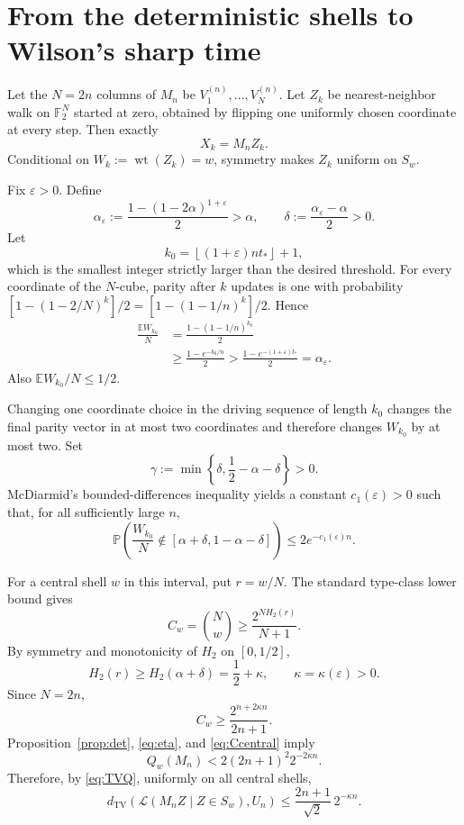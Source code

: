 \documentclass[11pt]{article}
\newcommand{\F}{\mathbb F}
\newcommand{\TV}{d_{\mathrm{TV}}}
\newcommand{\1}{\mathbf 1}
\newcommand{\wt}{\operatorname{wt}}
\newcommand{\E}{\mathbb E}
\newcommand{\Pp}{\mathbb P}
\begin{document}
\section{From the deterministic shells to Wilson's sharp time}

Let the $N=2n$ columns of $M_n$ be $V_1^{(n)},\dots,V_N^{(n)}$.  Let $Z_k$ be nearest-neighbor walk on $\F_2^N$ started at zero, obtained by flipping one uniformly chosen coordinate at every step.  Then exactly
\begin{equation}\label{eq:projection}
 X_k=M_nZ_k.
\end{equation}
Conditional on $W_k:=\wt(Z_k)=w$, symmetry makes $Z_k$ uniform on $S_w$.

Fix $\varepsilon>0$.  Define
\[
 \alpha_\varepsilon
 :=\frac{1-(1-2\alpha)^{1+\varepsilon}}2>\alpha,
 \qquad
 \delta:=\frac{\alpha_\varepsilon-\alpha}{2}>0.
\]
Let
\begin{equation}\label{eq:k0}
 k_0=\left\lfloor(1+\varepsilon)nt_*\right\rfloor+1,
\end{equation}
which is the smallest integer strictly larger than the desired threshold.
For every coordinate of the $N$-cube, parity after $k$ updates is one with probability
$[1-(1-2/N)^k]/2=[1-(1-1/n)^k]/2$.  Hence
\begin{align}
 \frac{\E W_{k_0}}N
 &=\frac{1-(1-1/n)^{k_0}}2\\
 &\ge\frac{1-e^{-k_0/n}}2
 >\frac{1-e^{-(1+\varepsilon)t_*}}2
 =\alpha_\varepsilon.
\end{align}
Also $\E W_{k_0}/N\le1/2$.

Changing one coordinate choice in the driving sequence of length $k_0$ changes the final parity vector in at most two coordinates and therefore changes $W_{k_0}$ by at most two.  Set
\[
 \gamma:=\min\left\{\delta,\frac12-\alpha-\delta\right\}>0.
\]
McDiarmid's bounded-differences inequality yields a constant $c_1(\varepsilon)>0$ such that, for all sufficiently large $n$,
\begin{equation}\label{eq:weightconc}
 \Pp\!\left(\frac{W_{k_0}}N\notin
 [\alpha+\delta,1-\alpha-\delta]\right)
 \le 2e^{-c_1(\varepsilon)n}.
\end{equation}

For a central shell $w$ in this interval, put $r=w/N$.  The standard type-class lower bound gives
\[
 C_w=\binom Nw\ge\frac{2^{NH_2(r)}}{N+1}.
\]
By symmetry and monotonicity of $H_2$ on $[0,1/2]$,
\[
 H_2(r)\ge H_2(\alpha+\delta)=\frac12+\kappa,
 \qquad \kappa=\kappa(\varepsilon)>0.
\]
Since $N=2n$,
\begin{equation}\label{eq:Ccentral}
 C_w\ge\frac{2^{n+2\kappa n}}{2n+1}.
\end{equation}
Proposition~\ref{prop:det}, \eqref{eq:eta}, and \eqref{eq:Ccentral} imply
\begin{equation}\label{eq:Qcentral}
 Q_w(M_n)
 <2(2n+1)^2 2^{-2\kappa n}.
\end{equation}
Therefore, by \eqref{eq:TVQ}, uniformly on all central shells,
\begin{equation}\label{eq:TVcentral}
 \TV(\mathcal L(M_nZ\mid Z\in S_w),U_n)
 \le\frac{2n+1}{\sqrt2}\,2^{-\kappa n}.
\end{equation}
\end{document}
